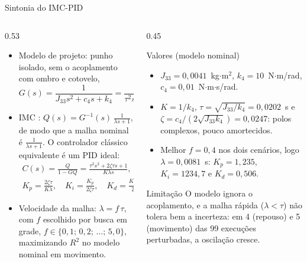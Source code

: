 \begin{frame}{Sintonia do IMC-PID}
  \begin{columns}[T]
    \begin{column}{0.53\textwidth}
      \footnotesize
      \begin{itemize}
        \setlength{\itemsep}{0.12cm}
        \item Modelo de projeto: punho isolado, sem o acoplamento com ombro e cotovelo,
          \begin{equation*}
            G(s) = \frac{1}{J_{33}s^2 + c_4 s + k_4} = \frac{K}{\tau^2 s^2 + 2\zeta\tau s + 1}.
          \end{equation*}
        \item IMC \cite{Rivera:1986}: $Q(s) = G^{-1}(s)\,\frac{1}{\lambda s + 1}$, de modo que a malha nominal é $\frac{1}{\lambda s + 1}$. O controlador clássico equivalente é um PID ideal:
          \begin{gather*}
            C(s) = \frac{Q}{1 - GQ} = \frac{\tau^2 s^2 + 2\zeta\tau s + 1}{K\lambda s}, \\
            K_p = \frac{2\zeta\tau}{K\lambda}, \quad
            K_i = \frac{K_p}{2\zeta\tau}, \quad
            K_d = \frac{K_p\,\tau}{2\zeta}.
          \end{gather*}
        \item Velocidade da malha: $\lambda = f\,\tau$, com $f$ escolhido por busca em grade, $f \in \{0{,}1;\, 0{,}2;\, \dots;\, 5{,}0\}$, maximizando $R^2$ no modelo nominal em movimento.
      \end{itemize}
    \end{column}
    \begin{column}{0.45\textwidth}
      \begin{block}{Valores (modelo nominal)}
        \footnotesize
        \begin{itemize}
          \item $J_{33} = 0{,}0041$~kg$\cdot$m$^2$, $k_4 = 10$~N$\cdot$m/rad, $c_4 = 0{,}01$~N$\cdot$m$\cdot$s/rad.
          \item $K = 1/k_4$, $\tau = \sqrt{J_{33}/k_4} = 0{,}0202$~s e $\zeta = c_4 / (2\sqrt{J_{33}k_4}) = 0{,}0247$: polos complexos, pouco amortecidos.
          \item Melhor $f = 0{,}4$ nos dois cenários, logo $\lambda = 0{,}0081$~s: $K_p = 1{,}235$, $K_i = 1234{,}7$ e $K_d = 0{,}506$.
        \end{itemize}
      \end{block}
      \begin{alertblock}{Limitação}
        \footnotesize
        O modelo ignora o acoplamento, e a malha rápida ($\lambda < \tau$) não tolera bem a incerteza: em 4 (repouso) e 5 (movimento) das 99 execuções perturbadas, a oscilação cresce.
      \end{alertblock}
    \end{column}
  \end{columns}
\end{frame}


